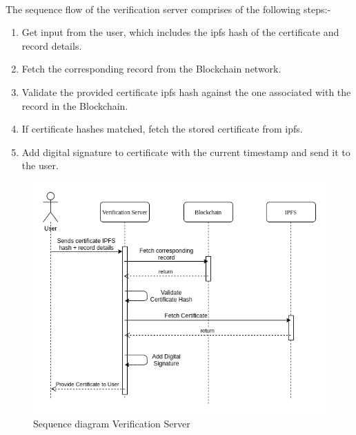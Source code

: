 \documentclass[12pt]{article}
\begin{document}
        \paragraph{}
        The sequence flow of the verification server comprises of the following steps:-
        \begin{enumerate}
            \item Get input from the user, which includes the \acrshort{ipfs} hash of the certificate and record details.
            \item Fetch the corresponding record from the Blockchain network.
            \item Validate the provided certificate \acrshort{ipfs} hash against the one associated with the record in the Blockchain.
            \item If certificate hashes matched, fetch the stored certificate from \acrshort{ipfs}.
            \item Add digital signature to certificate with the current timestamp and send it to the user.
        \end{enumerate}
        
        \begin{figure}[H]
                \includegraphics[scale=0.5]{verification_seq.png}
                \centering
                \caption{Sequence diagram Verification Server}
        \end{figure}
        
\end{document}
